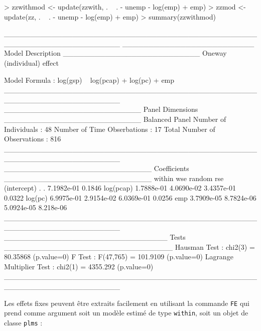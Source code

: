 \documentclass[a4paper]{article}
\begin{document}
\begin{Schunk}
\begin{Sinput}
> zzwithmod <- update(zzwith, . ~ . - unemp - log(emp) + emp)
> zzmod <- update(zz, . ~ . - unemp - log(emp) + emp)
> summary(zzwithmod)
\end{Sinput}
\begin{Soutput}
______________________________________________________________________ 
_________________________ Model Description __________________________
Oneway (individual) effect

Model Formula        : log(gsp) ~ log(pcap) + log(pc) + emp
______________________________________________________________________ 
__________________________ Panel Dimensions __________________________
Balanced Panel
Number of Individuals        :  48
Number of Time Obserbations  :  17
Total Number of Observations :  816
______________________________________________________________________ 
____________________________ Coefficients ____________________________
                within        wse     random       rse
(intercept)          .          . 7.1982e-01    0.1846
log(pcap)   1.7888e-01 4.0690e-02 3.4357e-01    0.0322
log(pc)     6.9975e-01 2.9154e-02 6.0369e-01    0.0256
emp         3.7909e-05 8.7824e-06 5.0924e-05 8.218e-06
______________________________________________________________________ 
_______________________________ Tests ________________________________
Hausman Test                   : chi2(3) = 80.35868 (p.value=0)
F Test                         : F(47,765) = 101.9109 (p.value=0)
Lagrange Multiplier Test       : chi2(1) = 4355.292 (p.value=0)
______________________________________________________________________ 
\end{Soutput}
\end{Schunk}


Les effets fixes peuvent être extraits facilement en utilisant la
commande \texttt{FE} qui prend comme argument soit un modèle estimé de
type \texttt{within}, soit un objet de classe \texttt{plms} :
\end{document}
